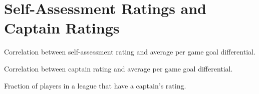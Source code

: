 \section{Self-Assessment Ratings and Captain Ratings}\label{sec:self_rating}

Correlation between self-assessment rating and average per game goal differential.

Correlation between captain rating and average per game goal differential.

Fraction of players in a league that have a captain's rating.